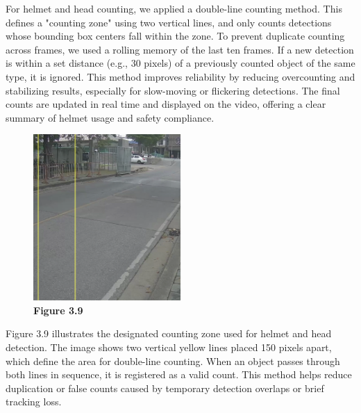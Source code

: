 \noindent\hspace{2.5em}For helmet and head counting, we applied a double-line counting method. This defines a "counting zone" using two vertical lines, and only counts detections whose bounding box centers fall within the zone. To prevent duplicate counting across frames, we used a rolling memory of the last ten frames. If a new detection is within a set distance (e.g., 30 pixels) of a previously counted object of the same type, it is ignored.
\newline
This method improves reliability by reducing overcounting and stabilizing results, especially for slow-moving or flickering detections. The final counts are updated in real time and displayed on the video, offering a clear summary of helmet usage and safety compliance.
\begin{figure}[H] %
	\centering
	\includegraphics[width=0.5\textwidth]{headhel1.png}
	\vspace{0.5em}
	\caption*{\textbf{Figure 3.9}}
\end{figure}
\hfill

\noindent\hspace{2.5em}Figure 3.9 illustrates the designated counting zone used for helmet and head detection. The image shows two vertical yellow lines placed 150 pixels apart, which define the area for double-line counting. When an object passes through both lines in sequence, it is registered as a valid count. This method helps reduce duplication or false counts caused by temporary detection overlaps or brief tracking loss.

